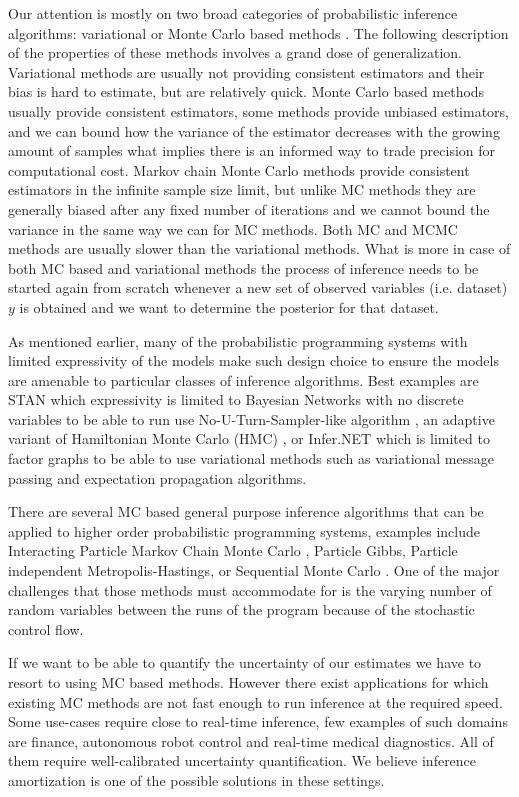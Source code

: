 \documentclass[12pt]{article}
\begin{document}
Our attention is mostly on two broad categories of probabilistic inference algorithms: variational \citep{WainwrightJordan2008} or Monte Carlo based methods \citep{mcbook}.
The following description of the properties of these methods involves a grand dose of generalization.
Variational methods are usually not providing consistent estimators and their bias is hard to estimate, but are relatively quick.
Monte Carlo based methods usually provide consistent estimators, some methods provide unbiased estimators, and we can bound how the variance of the estimator decreases with the growing amount of samples what implies there is an informed way to trade precision for computational cost.
Markov chain Monte Carlo methods provide consistent estimators in the infinite sample size limit, but unlike MC methods they are generally biased after any fixed number of iterations \citep{JacobEtAl2017} and we cannot bound the variance in the same way we can for MC methods.
Both MC and MCMC methods are usually slower than the variational methods.
What is more in case of both MC based and variational methods the process of inference needs to be started again from scratch whenever a new set of observed variables (i.e. dataset) $y$ is obtained and we want to determine the posterior for that dataset.  

As mentioned earlier, many of the probabilistic programming systems with limited expressivity of the models make such design choice to ensure the models are amenable to particular classes of inference algorithms. 
Best examples are STAN which expressivity is limited to Bayesian Networks with no discrete variables to be able to run use No-U-Turn-Sampler-like algorithm \citep{NUTS}, an adaptive variant of Hamiltonian Monte Carlo (HMC) \citep{HMC}, or Infer.NET which is limited to factor graphs to be able to use variational methods such as variational message passing \citep{variationalmessagepassing} and expectation propagation \citep{EP} algorithms.

There are several MC based general purpose inference algorithms that can be applied to higher order probabilistic programming systems, examples include Interacting Particle Markov Chain Monte Carlo \citep{rainforth2016interacting}, Particle Gibbs, Particle independent Metropolis-Hastings, or Sequential Monte Carlo \citep{WoodEtAl2014}.
One of the major challenges that those methods must accommodate for is the varying number of random variables between the runs of the program because of the stochastic control flow.  

If we want to be able to quantify the uncertainty of our estimates we have to resort to using MC based methods.
However there exist applications for which existing MC methods are not fast enough to run inference at the required speed.
Some use-cases require close to real-time inference, few examples of such domains are finance, autonomous robot control and real-time medical diagnostics. 
All of them require well-calibrated uncertainty quantification.
We believe inference amortization is one of the possible solutions in these settings.
\end{document}
